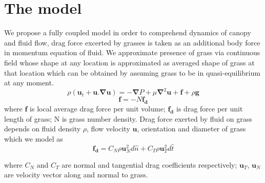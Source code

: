 \documentclass[aps,preprint,floatfix,prl]{revtex4-1}
\newcommand{\bu}{\mathbf{u}}
\newcommand{\grad}{\mathbf{\nabla}}
\newcommand{\del}{\partial}
\begin{document}
\section{The model}
We propose a fully coupled model in order to comprehend dynamics of canopy and fluid flow, drag force excerted by grasses is
taken as an additional body force in momentum equation of fluid. We approximate presence of grass via continuous field whose shape at any location is approximated as averaged 
shape of grass at that location which can be obtained by assuming grass to be in quasi-equilibrium at any moment.
\begin{equation}
\rho \left(\bu_{t}+\bu.\grad\bu \right) = -\grad P+\mu\grad^{2}\bu +\mathbf{f}+\rho\mathbf{g}
\end{equation}
\begin{equation}
 \mathbf{f}=-N\mathbf{f_{d}}
\end{equation}
where $\mathbf{f}$ is local average drag force per unit volume; $\mathbf{f_{d}}$ is drag force per unit length of grass; N is grass number density. 
Drag force exerted by fluid on grass depends on fluid density $\rho$, flow velocity $\bu$, orientation and diameter of grass which we model as 
\begin{equation}
 \mathbf{f_{d}}=C_{N}\rho\bu_{N}^{2}d\hat{n}+C_{T}\rho\bu_{T}^{2}d\hat{t}
\end{equation}



where $C_{N}$ and $C_{T}$ are normal and tangential drag coefficients respectively; $\bu_{T}$, $\bu_{N}$ are velocity vector along and normal to grass.
  
\end{document}
